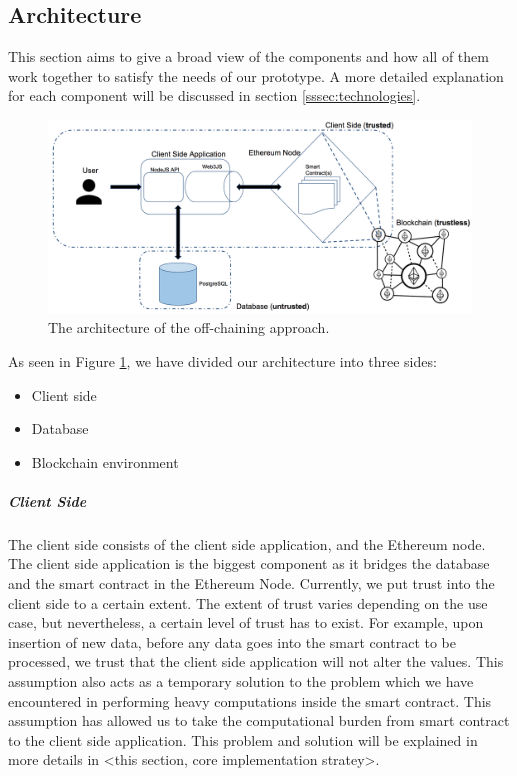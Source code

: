 \subsection{Architecture}

This section aims to give a broad view of the components and how all of them work together to satisfy the needs of our prototype. A more detailed explanation for each component will be discussed in section \ref{sssec:technologies}.

\begin{figure}[t]%
\centering
\includegraphics[width=1.0\textwidth]{images/architecture.png}
\caption{\label{fig:architecture}The architecture of the off-chaining approach.}
\end{figure}

As seen in Figure \ref{fig:architecture}, we have divided our architecture into three sides:
\begin{itemize}
\item Client side
\item Database
\item Blockchain environment
\end{itemize}

\subparagraph{Client Side}
The client side consists of the client side application, and the Ethereum node. The client side application is the biggest component as it bridges the database and the smart contract in the Ethereum Node. Currently, we put trust into the client side to a certain extent. The extent of trust varies depending on the use case, but nevertheless, a certain level of trust has to exist. For example, upon insertion of new data, before any data goes into the smart contract to be processed, we trust that the client side application will not alter the values. This assumption also acts as a temporary solution to the problem which we have encountered in performing heavy computations inside the smart contract. This assumption has allowed us to take the computational burden from smart contract to the client side application. This problem and solution will be explained in more details in <this section, core implementation stratey>.

